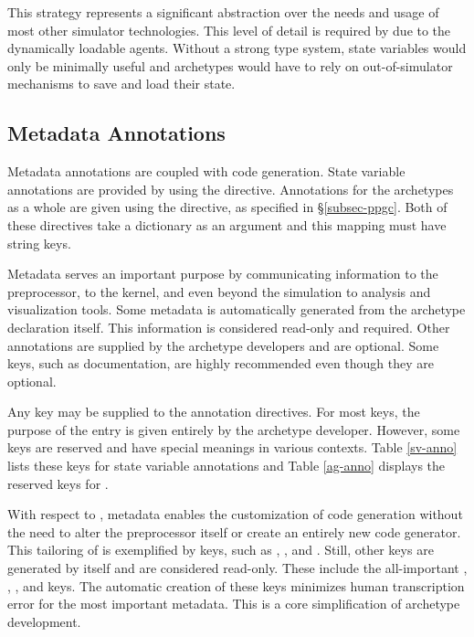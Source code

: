 This strategy represents a significant abstraction over the needs and usage of most
other simulator technologies. This level of detail is required by \cyclus due to the
dynamically loadable agents. Without a strong type system, state variables
would only be minimally useful and archetypes would have to rely on out-of-simulator
mechanisms to save and load their state.

\subsection{Metadata Annotations}

Metadata annotations are coupled with code generation.  State variable annotations
are provided by using the  directive. Annotations for
the archetypes as a whole are given using the  directive,
as specified in \S \ref{subsec-ppgc}. Both of these directives take a dictionary
as an argument and this mapping must have string keys.

Metadata serves an important purpose by communicating information to the \cyclus
preprocessor, to the \cyclus kernel, and even beyond the simulation to analysis
and visualization tools. Some metadata is automatically generated from the
archetype declaration itself.  This information is considered read-only and required.
Other annotations are supplied by the archetype developers and are optional.
Some keys, such as documentation, are highly recommended even though they
are optional.

Any key may be supplied to the annotation directives. For most keys, the
purpose of the entry is given entirely by the archetype developer. However,
some keys are reserved and have special meanings in various contexts. Table
\ref{sv-anno} lists these keys for state variable annotations and Table
\ref{ag-anno} displays the reserved keys for .

With respect to \cycpp, metadata enables the customization of code generation
without the need to alter the preprocessor itself or create an entirely new
code generator. This tailoring of \cycpp is exemplified by keys, such as ,
, and .  Still, other keys are generated by \cycpp itself
and are considered read-only.
These include the all-important , , , and
 keys.  The automatic
creation of these keys minimizes human transcription error for the most important
metadata. This is a core simplification of archetype development.

